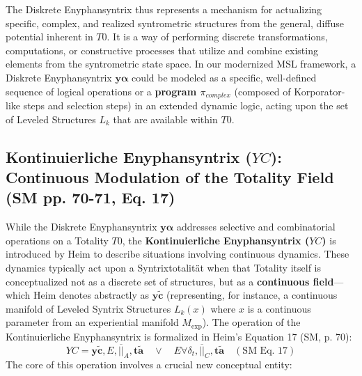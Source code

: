 \documentclass[
    12pt,              %
    a4paper,           %
    headings=normal,   %
    twoside=true,      %
    BCOR=8mm,          %
]{scrbook}
\newcommand{\syntrixtotalitaet}{T0}
\newcommand{\diskreteEnyphansyntrix}{\bm{y\alpha}}
\newcommand{\kontinuierlicheEnyphansyntrix}{YC}
\newcommand{\enyphane}{E}
\newcommand{\Mexp}{M_{\text{exp}}}
\begin{document}
The Diskrete Enyphansyntrix thus represents a mechanism for actualizing specific, complex, and realized syntrometric structures from the general, diffuse potential inherent in \(\syntrixtotalitaet\). It is a way of performing discrete transformations, computations, or constructive processes that utilize and combine existing elements from the syntrometric state space. In our modernized MSL framework, a Diskrete Enyphansyntrix \(\diskreteEnyphansyntrix\) could be modeled as a specific, well-defined sequence of logical operations or a \textbf{program \(\pi_{complex}\)} (composed of Korporator-like steps and selection steps) in an extended dynamic logic, acting upon the set of Leveled Structures \(L_k\) that are available within \(\syntrixtotalitaet\).

\subsection{Kontinuierliche Enyphansyntrix (\(\kontinuierlicheEnyphansyntrix\)): Continuous Modulation of the Totality Field (SM pp. 70-71, Eq. 17)}
\label{sec:ch4_kontinuierliche_enyphansyntrix_revised_2}

While the Diskrete Enyphansyntrix \(\diskreteEnyphansyntrix\) addresses selective and combinatorial operations on a Totality \(\syntrixtotalitaet\), the \textbf{Kontinuierliche Enyphansyntrix (\(\kontinuierlicheEnyphansyntrix\))} is introduced by Heim to describe situations involving continuous dynamics. These dynamics typically act upon a Syntrixtotalität when that Totality itself is conceptualized not as a discrete set of structures, but as a \textbf{continuous field}—which Heim denotes abstractly as \(\bm{y\widetilde{c}}\) (representing, for instance, a continuous manifold of Leveled Syntrix Structures \(L_k(x)\) where \(x\) is a continuous parameter from an experiential manifold \(\Mexp\)). The operation of the Kontinuierliche Enyphansyntrix is formalized in Heim’s Equation 17 (SM, p. 70):
\begin{equation} \label{eq:original_kontinuierliche_enyphansyntrix_revised_2} 
\kontinuierlicheEnyphansyntrix = \bm{y\widetilde{c}}, \enyphane, \overline{||}_A, \bm{t\widetilde{a}} \quad \lor \quad \enyphane\forall\delta_t, \overline{||}_C, \bm{t\widetilde{a}} \quad (\text{SM Eq. 17})
\end{equation}
The core of this operation involves a crucial new conceptual entity:
\end{document}
